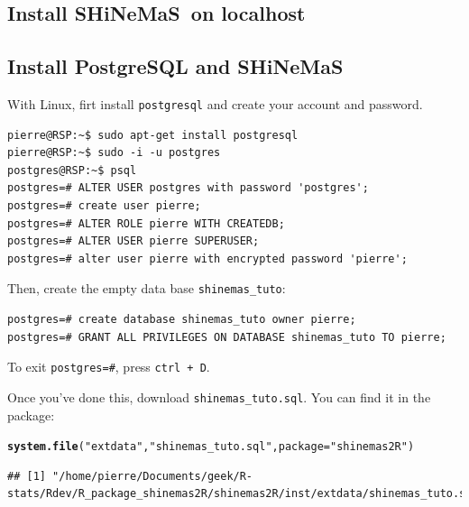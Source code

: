 \documentclass{article}\usepackage[]{graphicx}\usepackage[]{color}
\makeatletter
\newcommand{\hlstr}[1]{\textcolor[rgb]{0.192,0.494,0.8}{#1}}%
\newcommand{\hlstd}[1]{\textcolor[rgb]{0.345,0.345,0.345}{#1}}%
\newcommand{\hlkwc}[1]{\textcolor[rgb]{0.333,0.667,0.333}{#1}}%
\newcommand{\hlkwd}[1]{\textcolor[rgb]{0.737,0.353,0.396}{\textbf{#1}}}%
\newenvironment{kframe}{%
 \def\at@end@of@kframe{}%
 \ifinner\ifhmode%
  \def\at@end@of@kframe{\end{minipage}}%
  \begin{minipage}{\columnwidth}%
 \fi\fi%
 \def\FrameCommand##1{\hskip\@totalleftmargin \hskip-\fboxsep
 \colorbox{shadecolor}{##1}\hskip-\fboxsep
     \hskip-\linewidth \hskip-\@totalleftmargin \hskip\columnwidth}%
 \MakeFramed {\advance\hsize-\width
   \@totalleftmargin\z@ \linewidth\hsize
   \@setminipage}}%
 {\par\unskip\endMakeFramed%
 \at@end@of@kframe}
\newenvironment{knitrout}{}{} %
\newcommand{\BD}{SHiNeMaS}
\makeatother
\begin{document}
\newpage



\newpage

\begin{appendices}


\section{Install \BD~on localhost}
\label{install_shinemas}

\subsection{Install PostgreSQL and \BD}

With Linux, firt install \texttt{postgresql} and create your account and password.

\begin{verbatim}
pierre@RSP:~$ sudo apt-get install postgresql
pierre@RSP:~$ sudo -i -u postgres
postgres@RSP:~$ psql
postgres=# ALTER USER postgres with password 'postgres';
postgres=# create user pierre;
postgres=# ALTER ROLE pierre WITH CREATEDB;
postgres=# ALTER USER pierre SUPERUSER;
postgres=# alter user pierre with encrypted password 'pierre';
\end{verbatim}

Then, create the empty data base \texttt{shinemas\_tuto}:

\begin{verbatim}
postgres=# create database shinemas_tuto owner pierre;
postgres=# GRANT ALL PRIVILEGES ON DATABASE shinemas_tuto TO pierre;
\end{verbatim}

To exit \texttt{postgres=\#}, press \texttt{ctrl + D}.

Once you've done this, download \texttt{shinemas\_tuto.sql}.
You can find it in the package:

\begin{knitrout}
\color{fgcolor}\begin{kframe}
\begin{alltt}
\hlkwd{system.file}\hlstd{(}\hlstr{"extdata"}\hlstd{,} \hlstr{"shinemas_tuto.sql"}\hlstd{,} \hlkwc{package} \hlstd{=} \hlstr{"shinemas2R"}\hlstd{)}
\end{alltt}
\begin{verbatim}
## [1] "/home/pierre/Documents/geek/R-stats/Rdev/R_package_shinemas2R/shinemas2R/inst/extdata/shinemas_tuto.sql"
\end{verbatim}
\end{kframe}
\end{knitrout}


\end{appendices}
\end{document}
